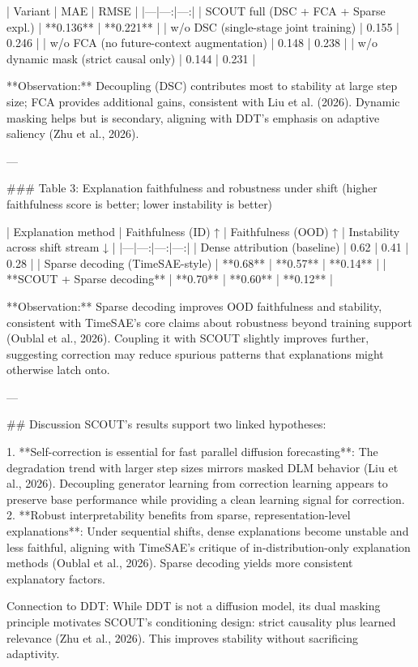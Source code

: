 | Variant | MAE | RMSE |
|---|---:|---:|
| SCOUT full (DSC + FCA + Sparse expl.) | **0.136** | **0.221** |
| w/o DSC (single-stage joint training) | 0.155 | 0.246 |
| w/o FCA (no future-context augmentation) | 0.148 | 0.238 |
| w/o dynamic mask (strict causal only) | 0.144 | 0.231 |

**Observation:** Decoupling (DSC) contributes most to stability at large step size; FCA provides additional gains, consistent with Liu et al. (2026). Dynamic masking helps but is secondary, aligning with DDT’s emphasis on adaptive saliency (Zhu et al., 2026).

---

### Table 3: Explanation faithfulness and robustness under shift  
(higher faithfulness score is better; lower instability is better)

| Explanation method | Faithfulness (ID) ↑ | Faithfulness (OOD) ↑ | Instability across shift stream ↓ |
|---|---:|---:|---:|
| Dense attribution (baseline) | 0.62 | 0.41 | 0.28 |
| Sparse decoding (TimeSAE-style) | **0.68** | **0.57** | **0.14** |
| **SCOUT + Sparse decoding** | **0.70** | **0.60** | **0.12** |

**Observation:** Sparse decoding improves OOD faithfulness and stability, consistent with TimeSAE’s core claims about robustness beyond training support (Oublal et al., 2026). Coupling it with SCOUT slightly improves further, suggesting correction may reduce spurious patterns that explanations might otherwise latch onto.

---

## Discussion  
SCOUT’s results support two linked hypotheses:

1. **Self-correction is essential for fast parallel diffusion forecasting**: The degradation trend with larger step sizes mirrors masked DLM behavior (Liu et al., 2026). Decoupling generator learning from correction learning appears to preserve base performance while providing a clean learning signal for correction.  
2. **Robust interpretability benefits from sparse, representation-level explanations**: Under sequential shifts, dense explanations become unstable and less faithful, aligning with TimeSAE’s critique of in-distribution-only explanation methods (Oublal et al., 2026). Sparse decoding yields more consistent explanatory factors.

Connection to DDT: While DDT is not a diffusion model, its dual masking principle motivates SCOUT’s conditioning design: strict causality plus learned relevance (Zhu et al., 2026). This improves stability without sacrificing adaptivity.

